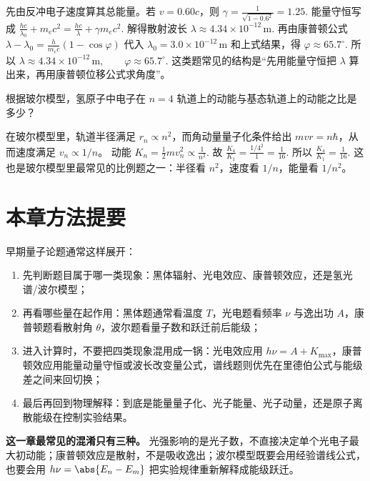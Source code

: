\documentclass[lang=cn,11pt]{elegantbook}
\begin{document}
\begin{solution}
先由反冲电子速度算其总能量。若 \(v=0.60c\)，则
 \(\gamma=\frac{1}{\sqrt{1-0.6^2}}=1.25.\) 
能量守恒写成
 \(\frac{hc}{\lambda_0}+m_ec^2=\frac{hc}{\lambda}+\gamma m_ec^2.\) 
解得散射波长
 \(\lambda\approx 4.34\times 10^{-12}\,\mathrm{m}.\) 
再由康普顿公式
 \(\lambda-\lambda_0=\frac{h}{m_ec}(1-\cos\varphi)\) 
代入 \(\lambda_0=3.0\times 10^{-12}\,\mathrm{m}\) 和上式结果，得
 \(\varphi\approx 65.7^\circ.\) 
所以
 \(\boxed{ \lambda\approx 4.34\times 10^{-12}\,\mathrm{m},\qquad \varphi\approx 65.7^\circ. }\) 
这类题常见的结构是“先用能量守恒把 \(\lambda\) 算出来，再用康普顿位移公式求角度”。
\end{solution}

\begin{exercise}[玻尔模型中 \(n=4\) 与基态的动能比]
根据玻尔模型，氢原子中电子在 \(n=4\) 轨道上的动能与基态轨道上的动能之比是多少？
\end{exercise}

\begin{solution}
在玻尔模型里，轨道半径满足 \(r_n\propto n^2\)，而角动量量子化条件给出 \(mvr=n\hbar\)，从而速度满足 \(v_n\propto 1/n\)。
动能
 \(K_n=\frac12 mv_n^2\propto \frac{1}{n^2}.\) 
故
 \(\frac{K_4}{K_1}=\frac{1/4^2}{1}=\frac{1}{16}.\) 
所以
 \(\boxed{\frac{K_4}{K_1}=\frac{1}{16}.}\) 
这也是玻尔模型里最常见的比例题之一：半径看 \(n^2\)，速度看 \(1/n\)，能量看 \(1/n^2\)。
\end{solution}

\section{本章方法提要}

早期量子论题通常这样展开：
\begin{enumerate}
 \item 先判断题目属于哪一类现象：黑体辐射、光电效应、康普顿效应，还是氢光谱/波尔模型；
 \item 再看哪些量在起作用：黑体题通常看温度 \(T\)，光电题看频率 \(\nu\) 与逸出功 \(A\)，康普顿题看散射角 \(\theta\)，波尔题看量子数和跃迁前后能级；
 \item 进入计算时，不要把四类现象混用成一锅：光电效应用 \(h\nu=A+K_{\max}\)，康普顿效应用能量动量守恒或波长改变量公式，谱线题则优先在里德伯公式与能级差之间来回切换；
 \item 最后再回到物理解释：到底是能量量子化、光子能量、光子动量，还是原子离散能级在控制实验结果。
\end{enumerate}

\begin{note}
\textbf{这一章最常见的混淆只有三种。} 光强影响的是光子数，不直接决定单个光电子最大初动能；康普顿效应是散射，不是吸收逸出；波尔模型既要会用经验谱线公式，也要会用
 \(h\nu=\abs{E_n-E_m}\) 
把实验规律重新解释成能级跃迁。
\end{note}
\end{document}
